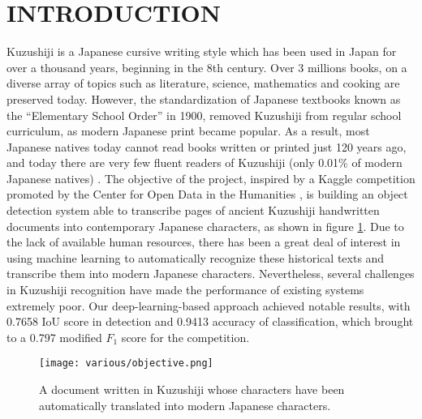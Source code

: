 \section{INTRODUCTION}
\label{sec:intro}

Kuzushiji is a Japanese cursive writing style which has been used in Japan for over a thousand years, beginning in the 8th century. Over 3 millions books, on a diverse array of topics such as literature, science, mathematics and cooking are preserved today. However, the standardization of Japanese textbooks known as the “Elementary School Order” in 1900, removed Kuzushiji from regular school curriculum, as modern Japanese print became popular. As a result, most Japanese natives today cannot read books written or printed just 120 years ago, and today there are very few fluent readers of Kuzushiji (only 0.01\% of modern Japanese natives) \cite{aboutkuz}. The objective of the project, inspired by a Kaggle competition promoted by the Center for Open Data in the Humanities \cite{competition}, is building an object detection system able to transcribe pages of ancient Kuzushiji handwritten documents into contemporary Japanese characters, as shown in figure \ref{fig:objective}. Due to the lack of available human resources, there has been a great deal of interest in using machine learning to automatically recognize these historical texts and transcribe them into modern Japanese characters. Nevertheless, several challenges in Kuzushiji recognition have made the performance of existing systems extremely poor. Our deep-learning-based approach achieved notable results, with 0.7658 IoU score in detection and 0.9413 accuracy of classification, which brought to a 0.797 modified $F_1$ score for the competition.

\begin{figure}
	\centering
	\caption{A document written in Kuzushiji whose characters have been automatically translated into modern Japanese characters.}
	\texttt{[image: various/objective.png]}
	\label{fig:objective}
\end{figure}